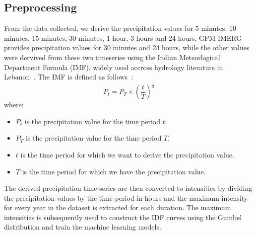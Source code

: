 \subsection{Preprocessing}
From the data collected, we derive the precipitation values for 5 minutes, 10 minutes, 15 minutes, 30 minutes, 1 hour, 3 hours and 24 hours. GPM-IMERG provides precipitation values for 30 minutes and 24 hours, while the other values were dervived from these two timeseries using the Indian Meteorlogical Department Formula (IMF), widely used accross hydrology literature in Lebanon~\cite{}.%
The IMF is defined as follows~\cite{}:
\begin{equation}
P_{t} = P_{T} \times {\left(\frac{t}{T}\right)}^{\frac{1}{3}}
\end{equation}
where:
\begin{itemize}
  \item $P_{t}$ is the precipitation value for the time period $t$.
  \item $P_{T}$ is the precipitation value for the time period $T$.
  \item $t$ is the time period for which we want to derive the precipitation value.
  \item $T$ is the time period for which we have the precipitation value.
\end{itemize}
The derived precipitation time-series are then converted to intensities by dividing the precipitation values by the time period in hours and the maximum intensity for every year in the dataset is extracted for each duration. The maximum intensities is subsequently used to construct the IDF curves using the Gumbel distribution and train the machine learning models.